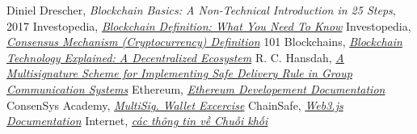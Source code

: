 \newpage
\thispagestyle{empty} %
\begin{thebibliography}{}
     Diniel Drescher, \textit{Blockchain Basics: A Non-Technical Introduction in 25 Steps}, 2017
     Investopedia, \textit{\href{https://www.investopedia.com/terms/b/blockchain.asp}{Blockchain Definition: What You Need To Know}}
     Investopedia, \textit{\href{https://www.investopedia.com/terms/c/consensus-mechanism-cryptocurrency.asp}{Consensus Mechanism (Cryptocurrency) Definition}}
     101 Blockchains, \textit{\href{https://101blockchains.com/blockchain-technology-explained/}{Blockchain Technology Explained: A Decentralized Ecosystem}}
     R. C. Hansdah, \textit{\href{https://www.researchgate.net/publication/225674307_A_Multisignature_Scheme_for_Implementing_Safe_Delivery_Rule_in_Group_Communication_Systems}{A Multisignature Scheme for Implementing Safe Delivery Rule in Group Communication Systems}}
     Ethereum, \textit{\href{https://ethereum.org/en/developers/docs/}{Ethereum Developement Documentation}}
     ConsenSys Academy, \textit{\href{https://github.com/ConsenSys-Academy/multisig-wallet-exercise}{MultiSig. Wallet Excercise}}
     ChainSafe, \textit{\href{https://web3js.readthedocs.io/en/v1.7.0/}{Web3.js Documentation}}
     Internet, \textit{\href{https://letmegooglethat.com/?q=blockchain}{các thông tin về Chuỗi khối}}
\end{thebibliography}